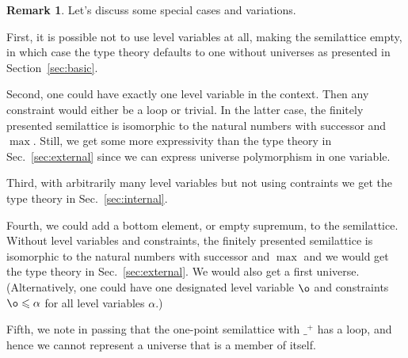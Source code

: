 \documentclass[11pt,a4paper]{article}
\theoremstyle{definition}
\newtheorem{remark}{Remark}
\newcommand{\Id}{\mathsf{Id}}
\newcommand{\UU}{\mathsf{U}}
\newcommand{\lam}[1]{{\langle}#1{\rangle}}
\begin{document}




\begin{remark}
Let's discuss some special cases and variations. 

First, it is possible not to use
level variables at all, making the semilattice empty,
in which case the type theory defaults to one without universes
as presented in Section~\ref{sec:basic}.

Second, one could have exactly one level variable in the context. 
Then any constraint would either be a loop or trivial. 
In the latter case, the finitely presented semilattice
is isomorphic to the natural numbers with successor and $\max$. 
Still, we get some more
expressivity than the type theory in Sec.~\ref{sec:external} since
we can express universe polymorphism in one variable.

Third, with arbitrarily many level variables but not using contraints
we get the type theory in Sec.~\ref{sec:internal}.

Fourth, we could add a bottom element, or empty supremum, to the semilattice.
Without level variables and constraints, the finitely presented semilattice
is isomorphic to the natural numbers with successor and $\max$
and we would get the type theory in Sec.~\ref{sec:external}.
We would also get a first universe.
(Alternatively, one could have one designated level variable
$\o$ and constraints $\o\leqslant\alpha$
for all level variables $\alpha$.)

Fifth, we note in passing that the one-point semilattice 
with $\_^+$ has a loop, and hence we cannot represent a
universe that is a member of itself.
\end{remark}
\end{document}
